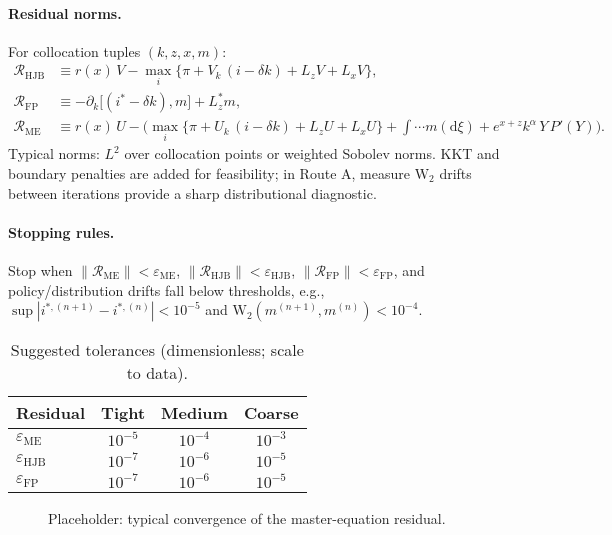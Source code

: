 ﻿\documentclass[11pt,letterpaper,oneside]{article}
\numberwithin{equation}{section}
\newcommand{\1}{\mathbf{1}}
\newcommand{\diff}{\mathrm{d}}
\newcommand{\Lz}{L_z}
\newcommand{\Lx}{L_x}
\newcommand{\Lzadj}{L_z^{\!*}}
\newcommand{\dxi}{ m(\diff \xi)}
\begin{document}
\paragraph{Residual norms.}
For collocation tuples $(k,z,x,m)$:
\begin{align*}
\mathcal{R}_{\mathrm{HJB}} &\equiv r(x)\, V - \max_{i}\{\pi + V_k\,(i-\delta k) + \Lz V + \Lx V\},\\
\mathcal{R}_{\mathrm{FP}}  &\equiv -\partial_k\big[(i^*-\delta k),m\big] + \Lzadj m,\\
\mathcal{R}_{\mathrm{ME}}  &\equiv r(x)\,U - \Big(\max_{i}\{\pi + U_k\,(i-\delta k) + \Lz U + \Lx U\}
  + \int\cdots\dxi
  + e^{x+z}k^\alpha\, Y\, P'(Y)\Big).
\end{align*}
  Typical norms: $L^2$ over collocation points or weighted Sobolev norms. KKT and boundary penalties are added for feasibility; in Route A, measure $\mathrm{W}_2$ drifts between iterations provide a sharp distributional diagnostic.

\paragraph{Stopping rules.}
Stop when $\|\mathcal{R}_{\mathrm{ME}}\|<\varepsilon_{\mathrm{ME}}$, $\|\mathcal{R}_{\mathrm{HJB}}\|<\varepsilon_{\mathrm{HJB}}$, $\|\mathcal{R}_{\mathrm{FP}}\|<\varepsilon_{\mathrm{FP}}$, and policy/distribution drifts fall below thresholds, e.g., $\sup|i^{*,(n+1)}-i^{*,(n)}|<10^{-5}$ and $\mathrm{W}_2(m^{(n+1)},m^{(n)})<10^{-4}$.

\begin{table}[ht]
\centering
\small
\begin{tabular}{@{}lccc@{}}
\toprule
Residual & Tight & Medium & Coarse \\
\midrule
$\varepsilon_{\mathrm{ME}}$ & $10^{-5}$ & $10^{-4}$ & $10^{-3}$ \\
$\varepsilon_{\mathrm{HJB}}$ & $10^{-7}$ & $10^{-6}$ & $10^{-5}$ \\
$\varepsilon_{\mathrm{FP}}$  & $10^{-7}$ & $10^{-6}$ & $10^{-5}$ \\
\bottomrule
\end{tabular}
\caption{Suggested tolerances (dimensionless; scale to data).}
\end{table}

\begin{figure}[ht]
\centering
{}
\caption{Placeholder: typical convergence of the master-equation residual.}
\end{figure}
\end{document}
